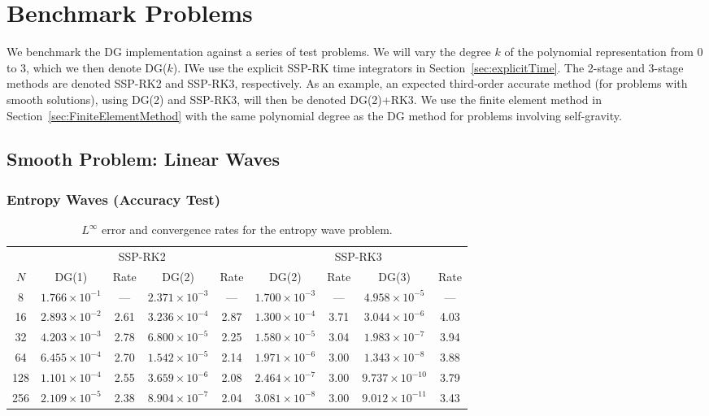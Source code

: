 \documentclass[10pt,preprint]{aastex}
\begin{document}
\section{Benchmark Problems}
\label{sec:NumericalExperiments}

We benchmark the DG implementation against a series of test problems.  
We will vary the degree $k$ of the polynomial representation from 0 to 3, which we then denote DG($k$).  
IWe use the explicit SSP-RK time integrators in Section~\ref{sec:explicitTime}.  
The 2-stage and 3-stage methods are denoted SSP-RK2 and SSP-RK3, respectively.  
As an example, an expected third-order accurate method (for problems with smooth solutions), using DG(2) and SSP-RK3, will then be denoted DG(2)+RK3.  
We use the finite element method in Section~\ref{sec:FiniteElementMethod} with the same polynomial degree as the DG method for problems involving self-gravity.  

\subsection{Smooth Problem: Linear Waves}

\subsubsection{Entropy Waves (Accuracy Test)}

\begin{table}
  \begin{center}
  \caption{$L^{\infty}$ error and convergence rates for the entropy wave problem.}
  \label{tab:streamingSineWave}
  \begin{tabular}{ccccccccc}
    & \multicolumn{4}{c}{SSP-RK2} & \multicolumn{4}{c}{SSP-RK3} \\
    \cmidrule(r){2-5} \cmidrule(r){6-9}
    $N$ & DG(1) & Rate & DG(2) & Rate & DG(2) & Rate & DG(3) & Rate \\
    \midrule \midrule
    8     & $1.766\times10^{-1}$ & ---  & $2.371\times10^{-3}$ & ---  & $1.700\times10^{-3}$ & ---  & $4.958\times10^{-5}$  & --- \\
    16   & $2.893\times10^{-2}$ &2.61& $3.236\times10^{-4}$ &2.87& $1.300\times10^{-4}$ &3.71& $3.044\times10^{-6}$ &4.03 \\
    32   & $4.203\times10^{-3}$ &2.78& $6.800\times10^{-5}$ &2.25& $1.580\times10^{-5}$ &3.04& $1.983\times10^{-7}$ &3.94 \\
    64   & $6.455\times10^{-4}$ &2.70& $1.542\times10^{-5}$ &2.14& $1.971\times10^{-6}$ &3.00& $1.343\times10^{-8}$ &3.88 \\
    128 & $1.101\times10^{-4}$ &2.55& $3.659\times10^{-6}$ &2.08& $2.464\times10^{-7}$ &3.00& $9.737\times10^{-10}$ &3.79 \\
    256 & $2.109\times10^{-5}$ &2.38& $8.904\times10^{-7}$ &2.04& $3.081\times10^{-8}$ &3.00& $9.012\times10^{-11}$ &3.43 \\
    \midrule \midrule
  \end{tabular}
  \end{center}
\end{table}
\end{document}
